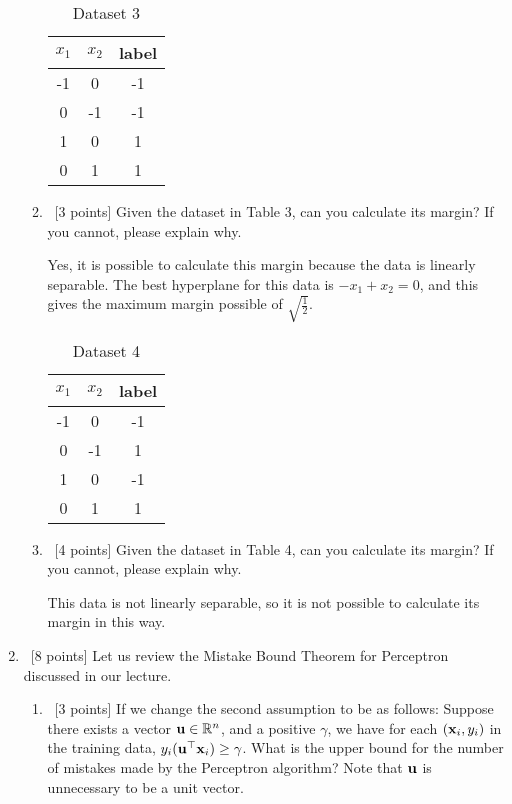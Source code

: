\documentclass[12pt, fullpage,letterpaper]{article}
\begin{document}
\begin{enumerate}
\begin{enumerate}
			\begin{table}[h]
				\centering
				\begin{tabular}{cc|c}
					$x_1$ & $x_2$ &  {label}\\ 
					\hline\hline
					-1 & 0 & -1 \\ \hline
					0 & -1 & -1 \\ \hline
					1 & 0 & 1 \\ \hline
					0 & 1 & 1 \\ \hline
				\end{tabular}
				\caption{Dataset 3}
			\end{table}
			\item~[3 points] Given the dataset in Table 3, can you calculate its margin? If you cannot, please explain why. 
			
			Yes, it is possible to calculate this margin because the data is linearly separable. The best hyperplane for this data is $-x_1 + x_2 = 0$, and this gives the maximum margin possible of $\sqrt{\frac{1}{2}}$.
			\begin{table}[h]
				\centering
				\begin{tabular}{cc|c}
					$x_1$ & $x_2$ &  {label}\\ 
					\hline\hline
						-1 & 0 & -1 \\ \hline
					0 & -1 & 1 \\ \hline
					1 & 0 & -1 \\ \hline
					0 & 1 & 1 \\ \hline
				\end{tabular}
				\caption{Dataset 4}
			\end{table}
			\item~[4 points] Given the dataset in Table 4, can you calculate its margin? If you cannot, please explain why. 
			
			This data is not linearly separable, so it is not possible to calculate its margin in this way.
			
		\end{enumerate}
	
	\item ~[8 points] Let us review the Mistake Bound Theorem for Perceptron discussed in our lecture. 
	\begin{enumerate}
		\item~[3 points] If we change the second assumption to be as follows: Suppose there exists a vector ${\bf u}\in \mathbb{R}^n$, and a positive $\gamma$, we have for each $({\bf x}_i, y_i)$ in the training data, $y_i({\bf u}^\top {\bf x}_i) \ge \gamma$. What is the upper bound for the number of mistakes made by the Perceptron algorithm?   Note that ${\bf u}$ is unnecessary to be a unit vector. 
		

\end{enumerate}
\end{enumerate}
\end{document}
